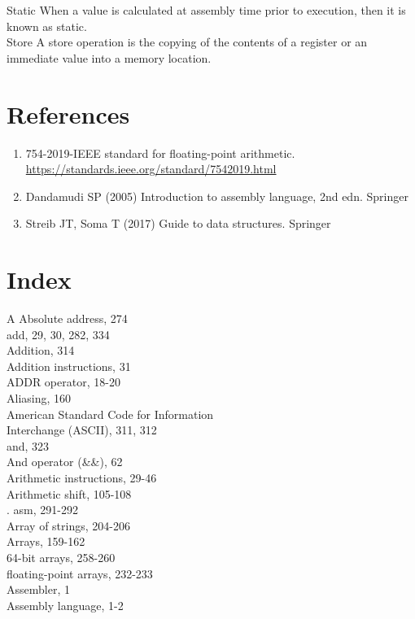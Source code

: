 \documentclass[10pt]{book}
\begin{document}
Static When a value is calculated at assembly time prior to execution, then it is known as static.\\

Store A store operation is the copying of the contents of a register or an immediate value into a memory location.

\chapter{References}
\begin{enumerate}
  \item 754-2019-IEEE standard for floating-point arithmetic. \href{https://standards.ieee.org/standard/7542019.html}{https://standards.ieee.org/standard/7542019.html}
  \item Dandamudi SP (2005) Introduction to assembly language, 2nd edn. Springer
  \item Streib JT, Soma T (2017) Guide to data structures. Springer
\end{enumerate}


\chapter{Index}
A
Absolute address, 274\\
add, 29, 30, 282, 334\\
Addition, 314\\
Addition instructions, 31\\
ADDR operator, 18-20\\
Aliasing, 160\\
American Standard Code for Information\\
Interchange (ASCII), 311, 312\\
and, 323\\
And operator (\&\&), 62\\
Arithmetic instructions, 29-46\\
Arithmetic shift, 105-108\\
. asm, 291-292\\
Array of strings, 204-206\\
Arrays, 159-162\\
64-bit arrays, 258-260\\
floating-point arrays, 232-233\\
Assembler, 1\\
Assembly language, 1-2
\end{document}
